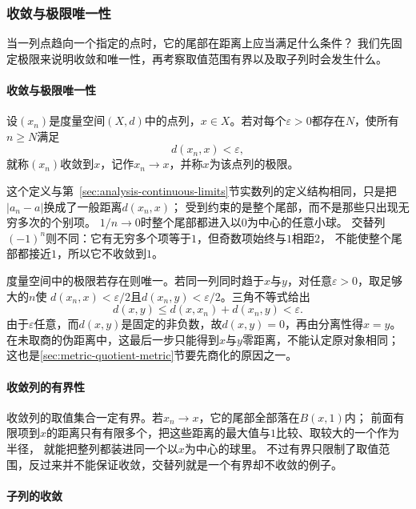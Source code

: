 \subsubsection{收敛与极限唯一性}
\label{sec:metric-convergence-and-uniqueness}

当一列点趋向一个指定的点时，它的尾部在距离上应当满足什么条件？
我们先固定极限来说明收敛和唯一性，再考察取值范围有界以及取子列时会发生什么。

\paragraph{收敛与极限唯一性}

\begin{definition}[点列收敛]
\label{def:metric-convergence}
设$(x_n)$是度量空间$(X,d)$中的点列，$x\in X$。若对每个$\varepsilon>0$都存在$N$，使所有$n\geq N$满足
\[
  d(x_n,x)<\varepsilon,
\]
就称$(x_n)$收敛到$x$，记作$x_n\to x$，并称$x$为该点列的极限。
\end{definition}

这个定义与第~\ref{sec:analysis-continuous-limits}节实数列的定义结构相同，只是把$|a_n-a|$换成了一般距离$d(x_n,x)$；
受到约束的是整个尾部，而不是那些只出现无穷多次的个别项。
$1/n\to0$时整个尾部都进入以$0$为中心的任意小球。
交替列$(-1)^n$则不同：它有无穷多个项等于$1$，但奇数项始终与$1$相距$2$，
不能使整个尾部都接近$1$，所以它不收敛到$1$。

度量空间中的极限若存在则唯一。若同一列同时趋于$x$与$y$，对任意$\varepsilon>0$，取足够大的$n$使
$d(x_n,x)<\varepsilon/2$且$d(x_n,y)<\varepsilon/2$。三角不等式给出
\[
  d(x,y)\leq d(x,x_n)+d(x_n,y)<\varepsilon.
\]
由于$\varepsilon$任意，而$d(x,y)$是固定的非负数，故$d(x,y)=0$，再由分离性得$x=y$。
在未取商的伪距离中，这最后一步只能得到$x$与$y$零距离，不能认定原对象相同；
这也是\ref{sec:metric-quotient-metric}节要先商化的原因之一。

\paragraph{收敛列的有界性}

收敛列的取值集合一定有界。若$x_n\to x$，它的尾部全部落在$B(x,1)$内；
前面有限项到$x$的距离只有有限多个，把这些距离的最大值与$1$比较、取较大的一个作为半径，
就能把整列都装进同一个以$x$为中心的球里。
不过有界只限制了取值范围，反过来并不能保证收敛，交替列就是一个有界却不收敛的例子。

\paragraph{子列的收敛}

